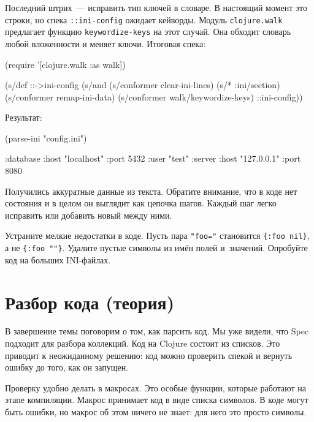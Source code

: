 \fi


Последний штрих~--- исправить тип ключей в словаре. В настоящий момент это
строки, но спека \verb|::ini-config| ожидает кейворды. Модуль
\verb|clojure.walk| предлагает функцию \verb|keywordize-keys| на этот
случай. Она обходит словарь любой вложенности и меняет ключи. Итоговая спека:

\begin{english}
  \begin{clojure}
(require '[clojure.walk :as walk])

(s/def ::->ini-config
  (s/and
   (s/conformer clear-ini-lines)
   (s/* :ini/section)
   (s/conformer remap-ini-data)
   (s/conformer walk/keywordize-keys)
   ::ini-config))
  \end{clojure}
\end{english}

\noindent
Результат:

\begin{english}
  \begin{clojure}
(parse-ini "config.ini")

{:database {:host "localhost"
            :port 5432
            :user "test"}
 :server {:host "127.0.0.1"
          :port 8080}}
  \end{clojure}
\end{english}

Получились аккуратные данные из текста. Обратите внимание, что в коде нет
состояния и в целом он выглядит как цепочка шагов. Каждый шаг легко исправить
или добавить новый между ними.

Устраните мелкие недостатки в коде. Пусть пара \verb|"foo="| становится
\verb|{:foo nil}|, а не \verb|{:foo ""}|.  Удалите пустые символы из
имён полей и~значений. Опробуйте код на больших INI-файлах.

\section{Разбор кода (теория)}


В завершение темы поговорим о том, как парсить код. Мы уже видели, что Spec
подходит для разбора коллекций. Код на Clojure состоит из списков. Это приводит
к неожиданному решению: код можно проверить спекой и вернуть ошибку до того, как
он запущен.

Проверку удобно делать в макросах. Это особые функции, которые работают на этапе
компиляции. Макрос принимает код в виде списка символов. В коде могут быть
ошибки, но макрос об этом ничего не знает: для него это просто символы.

